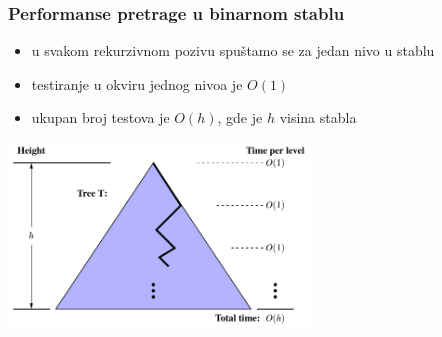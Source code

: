 \documentclass[compress]{beamer}
\begin{document}
\begin{frame}[fragile]
  \frametitle{Performanse pretrage u binarnom stablu}
  \begin{itemize}
    \item u svakom rekurzivnom pozivu spuštamo se za jedan nivo u stablu
    \item testiranje u okviru jednog nivoa je $O(1)$
    \item ukupan broj testova je $O(h)$, gde je $h$ visina stabla
  \end{itemize}
  \begin{center}
    \includegraphics[width=8cm]{asp-11-pic04.pdf}
  \end{center}
\end{frame}
\end{document}
